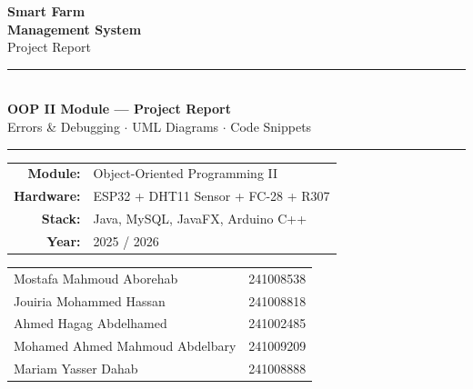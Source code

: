 \documentclass[12pt, a4paper]{report}
\begin{document}
\begin{titlepage}

\vspace*{1.5cm}
\begin{center}
    {\color{white}\fontsize{28}{34}\selectfont\bfseries Smart Farm}\\[4pt]
    {\color{white}\fontsize{22}{28}\selectfont\bfseries Management System}\\[10pt]
    {\color{white!80}\large Project Report}

    \vspace{3.5cm}

    {\color{white}\rule{10cm}{1pt}}\\[18pt]
    {\large\bfseries\color{white} OOP II Module --- Project Report}\\[10pt]
    {\color{white!90} Errors \& Debugging $\cdot$ UML Diagrams $\cdot$ Code Snippets}\\[30pt]
    {\color{white}\rule{10cm}{1pt}}

    \vfill

    \begin{tabular}{rl}
        \textbf{Module:}   & Object-Oriented Programming II \\[4pt]
        \textbf{Hardware:} & ESP32 + DHT11 Sensor + FC-28 + R307 \\[4pt]
        \textbf{Stack:}    & Java, MySQL, JavaFX, Arduino C++ \\[4pt]
        \textbf{Year:}     & 2025 / 2026 \\[12pt]
    \end{tabular}

    \vspace{8pt}
    {\small
    \begin{tabular}{ll}
        Mostafa Mahmoud Aborehab        & 241008538 \\
        Jouiria Mohammed Hassan         & 241008818 \\
        Ahmed Hagag Abdelhamed          & 241002485 \\
        Mohamed Ahmed Mahmoud Abdelbary & 241009209 \\
        Mariam Yasser Dahab             & 241008888 \\
    \end{tabular}}
\end{center}
\end{titlepage}
\end{document}
